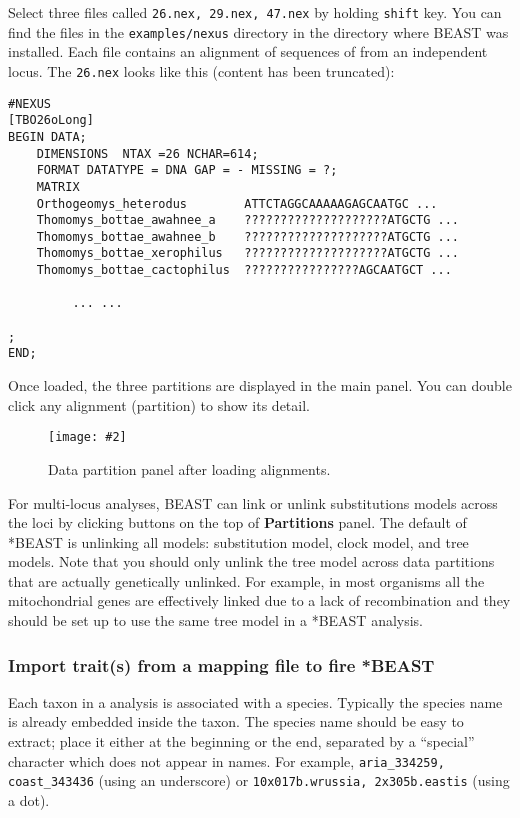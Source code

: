 \documentclass{article}
\newcommand{\includeimage}[2][]{%
\texttt{[image: \#2]}
}
\begin{document}
Select three files called \texttt{26.nex, 29.nex, 47.nex} by holding \texttt{shift} key. 
You can find the files in the {\tt examples/nexus} directory in the directory where BEAST was installed. 
Each file contains an alignment of sequences of from an independent locus. The \texttt{26.nex} looks like this (content has been truncated):

\begin{verbatim}
#NEXUS
[TBO26oLong]
BEGIN DATA;
	DIMENSIONS  NTAX =26 NCHAR=614;
	FORMAT DATATYPE = DNA GAP = - MISSING = ?;
	MATRIX	
	Orthogeomys_heterodus        ATTCTAGGCAAAAAGAGCAATGC ...
	Thomomys_bottae_awahnee_a    ????????????????????ATGCTG ...
	Thomomys_bottae_awahnee_b    ????????????????????ATGCTG ...
	Thomomys_bottae_xerophilus   ????????????????????ATGCTG ...
	Thomomys_bottae_cactophilus  ????????????????AGCAATGCT ...

         ... ...

;
END;
\end{verbatim}

\medskip{}

Once loaded, the three partitions are displayed in the main panel.
You can double click any alignment (partition) to show its detail.

\begin{figure}
\centering
\includeimage[scale=0.4,clip=true,trim=0 300 0 0]{figures/BEAUti_DataPartitions}

\caption{\label{fig.datapartition} Data partition panel after loading alignments.}
\end{figure}


For multi-locus analyses, BEAST can link or unlink substitutions models across the loci by clicking buttons on the top of {\bf Partitions} panel. The default of *BEAST is unlinking all models: substitution model, clock model, and tree models. Note that you should only unlink the tree model across data partitions that are actually genetically unlinked. For example, in most organisms all the mitochondrial genes are effectively linked due to a lack of recombination and they should be set up to use the same tree model in a *BEAST analysis. 

\subsubsection*{Import trait(s) from a mapping file to fire *BEAST}

Each taxon in a \mlstname{} analysis is associated with a species. Typically the
species name is already embedded inside the taxon. The species name should be
easy to extract; place it either at the beginning or the end, separated by a
``special'' character which does not appear in names. For example,
\texttt{aria\_334259, coast\_343436} (using an underscore) or
\texttt{10x017b.wrussia, 2x305b.eastis} (using a dot).
\end{document}
